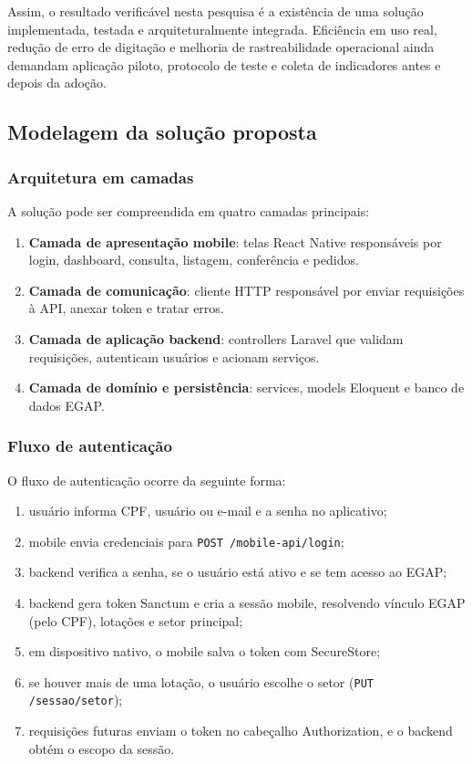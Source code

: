 \documentclass[12pt,a4paper]{article}
\begin{document}
Assim, o resultado verificável nesta pesquisa é a existência de uma solução implementada, testada e arquiteturalmente integrada. Eficiência em uso real, redução de erro de digitação e melhoria de rastreabilidade operacional ainda demandam aplicação piloto, protocolo de teste e coleta de indicadores antes e depois da adoção.

\subsection{Modelagem da solução proposta}

\subsubsection{Arquitetura em camadas}

A solução pode ser compreendida em quatro camadas principais:

\begin{enumerate}
    \item \textbf{Camada de apresentação mobile}: telas React Native responsáveis por login, dashboard, consulta, listagem, conferência e pedidos.
    \item \textbf{Camada de comunicação}: cliente HTTP responsável por enviar requisições à API, anexar token e tratar erros.
    \item \textbf{Camada de aplicação backend}: controllers Laravel que validam requisições, autenticam usuários e acionam serviços.
    \item \textbf{Camada de domínio e persistência}: services, models Eloquent e banco de dados EGAP.
\end{enumerate}

\subsubsection{Fluxo de autenticação}

O fluxo de autenticação ocorre da seguinte forma:

\begin{enumerate}
    \item usuário informa CPF, usuário ou e-mail e a senha no aplicativo;
    \item mobile envia credenciais para \texttt{POST /mobile-api/login};
    \item backend verifica a senha, se o usuário está ativo e se tem acesso ao EGAP;
    \item backend gera token Sanctum e cria a sessão mobile, resolvendo vínculo EGAP (pelo CPF), lotações e setor principal;
    \item em dispositivo nativo, o mobile salva o token com SecureStore;
    \item se houver mais de uma lotação, o usuário escolhe o setor (\texttt{PUT /sessao/setor});
    \item requisições futuras enviam o token no cabeçalho Authorization, e o backend obtém o escopo da sessão.
\end{enumerate}
\end{document}
